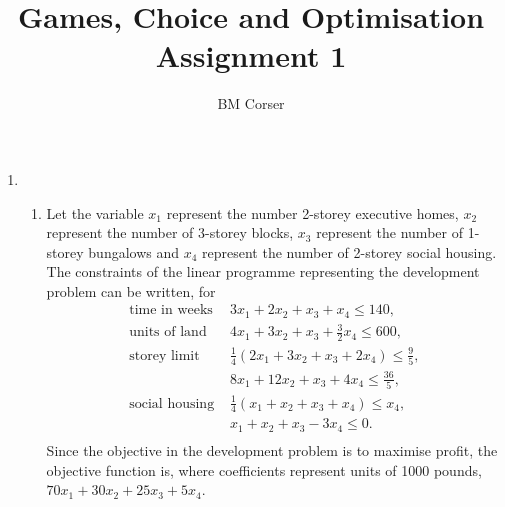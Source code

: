\documentclass[10pt]{article}
\author{BM Corser}
\title{Games, Choice and Optimisation Assignment 1}
\begin{document}
  \maketitle 
  \begin{enumerate}
    \item
    \begin{enumerate}
      \item Let the variable $x_1$ represent the number 2-storey executive
        homes, $x_2$ represent the number of 3-storey blocks, $x_3$ represent
        the number of 1-storey bungalows and $x_4$ represent the number of
        2-storey social housing. The constraints of the linear programme
        representing the development problem can be written, for
        \begin{align*}
          \text{time in weeks }  & 3x_1 + 2x_2 + x_3 + x_4 \leq 140, \\
          \text{units of land }  & 4x_1 + 3x_2 + x_3 + \tfrac{3}{2}x_4 \leq 600, \\
          \text{storey limit }   & \frac{1}{4}\left(2x_1 + 3x_2 + x_3 + 2x_4\right) \leq \frac{9}{5}, \\
                                  & 8x_1 + 12x_2 + x_3 + 4x_4 \leq \frac{36}{5}, \\
          \text{social housing } & \frac{1}{4}\left(x_1 + x_2 + x_3 + x_4\right) \leq x_4, \\
                                  & x_1 + x_2 + x_3 - 3x_4 \leq 0. \\
        \end{align*}
        Since the objective in the development problem is to maximise profit,
        the objective function is, where coefficients represent units of 1000
        pounds, $70x_1 + 30x_2 + 25x_3 + 5x_4$.


\end{enumerate}
\end{enumerate}
\end{document}
